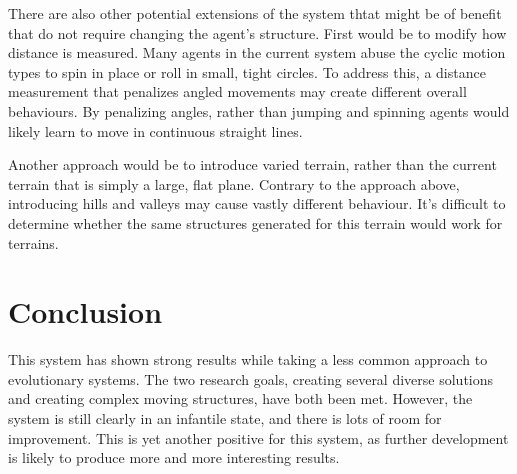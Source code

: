 \documentclass[runningheads]{llncs}
\begin{document}
There are also other potential extensions of the system thtat might be of benefit that do not require changing the agent's structure.
First would be to modify how distance is measured.
Many agents in the current system abuse the cyclic motion types to spin in place or roll in small, tight circles.
To address this, a distance measurement that penalizes angled movements may create different overall behaviours.
By penalizing angles, rather than jumping and spinning agents would likely learn to move in continuous straight lines.

Another approach would be to introduce varied terrain, rather than the current terrain that is simply a large, flat plane.
Contrary to the approach above, introducing hills and valleys may cause vastly different behaviour.
It's difficult to determine whether the same structures generated for this terrain would work for terrains.

\section{Conclusion}
This system has shown strong results while taking a less common approach to evolutionary systems.
The two research goals, creating several diverse solutions and creating complex moving structures, have both been met.
However, the system is still clearly in an infantile state, and there is lots of room for improvement.
This is yet another positive for this system, as further development is likely to produce more and more interesting results. 
\end{document}
